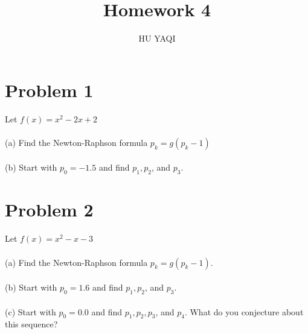 \documentclass{article}
\title{ Homework 4 }
\author{HU YAQI}
\begin{document}
\maketitle
\setlength{\parindent}{0pt}

\section{ Problem 1 }
Let $f(x)=x^2-2x+2$\\
\\
(a) Find the Newton-Raphson formula $p_k=g(p_k-1)$\\
\\
(b) Start with $p_0=-1.5$ and find $p_1,p_2$, and $p_3$.
\section{ Problem 2 }
Let $f(x)=x^2-x-3$\\
\\
(a) Find the Newton-Raphson formula $p_k=g(p_k-1)$.\\
\\
(b) Start with $p_0=1.6$ and find $p_1,p_2$, and $p_3$.\\
\\
(c) Start with $p_0=0.0$ and find $p_1,p_2,p_3$, and $p_4$. What do you conjecture about this sequence?
\end{document}
